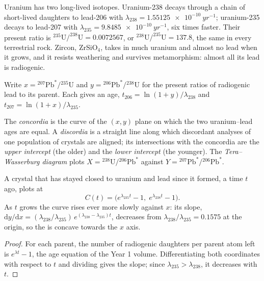 Uranium has two long-lived isotopes. Uranium-238 decays through a chain of
short-lived daughters to lead-206 with $\lambda_{238} =
\qty{1.55125e-10}{yr^{-1}}$; uranium-235 decays to lead-207 with $\lambda_{235}
= \qty{9.8485e-10}{yr^{-1}}$, six times faster. Their present ratio is
$^{235}\mathrm{U}/^{238}\mathrm{U} = 0.0072567$, or $^{238}\mathrm{U}/^{235}\mathrm{U}
= 137.8$, the same in every terrestrial rock. Zircon, $\mathrm{ZrSiO_4}$, takes
in much uranium and almost no lead when it grows, and it resists weathering
and survives metamorphism: almost all its lead is radiogenic.

Write $x = {}^{207}\mathrm{Pb}^*/{}^{235}\mathrm{U}$ and $y =
{}^{206}\mathrm{Pb}^*/{}^{238}\mathrm{U}$ for the present ratios of radiogenic
lead to its parent. Each gives an age, $t_{206} = \ln(1 + y)/\lambda_{238}$
and $t_{207} = \ln(1 + x)/\lambda_{235}$.

\begin{definition}
\label{def:b3:advanced-geochronology:concordia}
The \emph{concordia} is the curve of the $(x, y)$ plane on
which the two uranium--lead ages are equal. A \emph{discordia}
is a straight line along which discordant analyses of one population of
crystals are aligned; its intersections with the concordia are the
\emph{upper intercept} (the older) and the
\emph{lower intercept} (the younger). The
\emph{Tera--Wasserburg diagram} plots
$X = {}^{238}\mathrm{U}/{}^{206}\mathrm{Pb}^*$ against $Y =
{}^{207}\mathrm{Pb}^*/{}^{206}\mathrm{Pb}^*$.
\end{definition}

\begin{theorem}\label{thm:b3:advanced-geochronology:concordia}
A crystal that has stayed closed to uranium and lead since it formed, a time
$t$ ago, plots at
\[
C(t) = \bigl(e^{\lambda_{235}t} - 1,\; e^{\lambda_{238}t} - 1\bigr).
\]
As $t$ grows the curve rises ever more slowly against $x$: its slope,
$\mathrm dy/\mathrm dx = (\lambda_{238}/\lambda_{235})\,e^{(\lambda_{238} -
\lambda_{235})t}$, decreases from $\lambda_{238}/\lambda_{235} = 0.1575$ at the
origin, so the  is concave towards the $x$ axis.
\end{theorem}

\begin{proof}
For each parent, the number of radiogenic daughters per parent atom left is
$e^{\lambda t} - 1$, the age equation of the Year 1 volume. Differentiating
both coordinates with respect to $t$ and dividing gives the slope; since
$\lambda_{235} > \lambda_{238}$, it decreases with $t$.
\end{proof}

